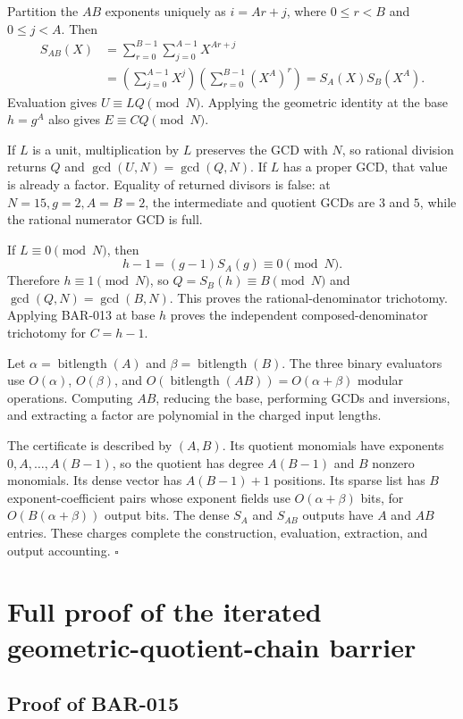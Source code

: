 \documentclass[11pt]{article}
\begin{document}
Partition the \(AB\) exponents uniquely as \(i=Ar+j\), where
\(0\le r<B\) and \(0\le j<A\). Then
\[
\begin{aligned}
S_{AB}(X)
 &=\sum_{r=0}^{B-1}\sum_{j=0}^{A-1}X^{Ar+j}\\
 &=\left(\sum_{j=0}^{A-1}X^j\right)
   \left(\sum_{r=0}^{B-1}(X^A)^r\right)
 =S_A(X)S_B(X^A).
\end{aligned}
\]
Evaluation gives \(U\equiv LQ\pmod N\). Applying the geometric identity at
the base \(h=g^A\) also gives \(E\equiv CQ\pmod N\).

If \(L\) is a unit, multiplication by \(L\) preserves the GCD with \(N\), so
rational division returns \(Q\) and
\(\gcd(U,N)=\gcd(Q,N)\). If \(L\) has a proper GCD, that value is already a
factor. Equality of returned divisors is false: at
\(N=15,g=2,A=B=2\), the intermediate and quotient GCDs are \(3\) and \(5\),
while the rational numerator GCD is full.

If \(L\equiv0\pmod N\), then
\[
h-1=(g-1)S_A(g)\equiv0\pmod N.
\]
Therefore \(h\equiv1\pmod N\), so \(Q=S_B(h)\equiv B\pmod N\) and
\(\gcd(Q,N)=\gcd(B,N)\). This proves the rational-denominator trichotomy.
Applying BAR-013 at base \(h\) proves the independent composed-denominator
trichotomy for \(C=h-1\).

Let \(\alpha=\operatorname{bitlength}(A)\) and
\(\beta=\operatorname{bitlength}(B)\). The three binary evaluators use
\(O(\alpha)\), \(O(\beta)\), and
\(O(\operatorname{bitlength}(AB))=O(\alpha+\beta)\) modular operations.
Computing \(AB\), reducing the base, performing GCDs and inversions, and
extracting a factor are polynomial in the charged input lengths.

The certificate is described by \((A,B)\). Its quotient monomials have
exponents \(0,A,\ldots,A(B-1)\), so the quotient has degree \(A(B-1)\) and
\(B\) nonzero monomials. Its dense vector has \(A(B-1)+1\) positions. Its
sparse list has \(B\) exponent-coefficient pairs whose exponent fields use
\(O(\alpha+\beta)\) bits, for
\(O(B(\alpha+\beta))\) output bits. The dense \(S_A\) and \(S_{AB}\) outputs
have \(A\) and \(AB\) entries. These charges complete the construction,
evaluation, extraction, and output accounting. \(\square\)

\section{Full proof of the iterated geometric-quotient-chain barrier}

\subsection{Proof of BAR-015}\label{proof:BAR-015}
\end{document}
